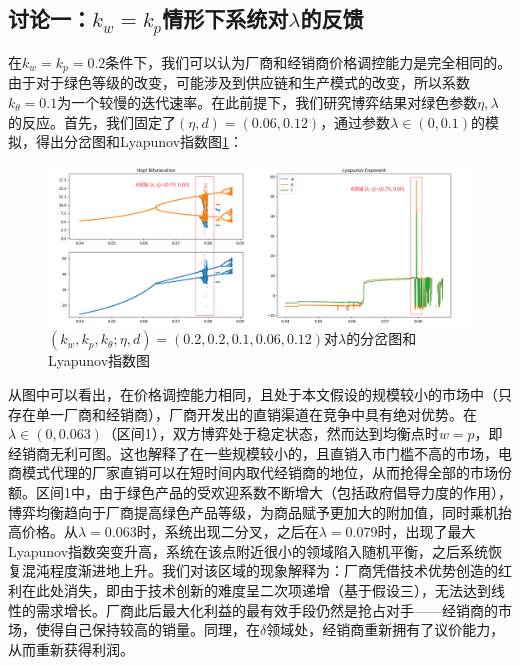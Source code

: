 \documentclass{article}
\begin{document}
\subsection{讨论一：$k_w=k_p$情形下系统对$\lambda$的反馈}
\par 在$k_w=k_p=0.2$条件下，我们可以认为厂商和经销商价格调控能力是完全相同的。由于对于绿色等级的改变，可能涉及到供应链和生产模式的改变，所以系数$k_\theta=0.1$为一个较慢的迭代速率。在此前提下，我们研究博弈结果对绿色参数$\eta, \lambda$的反应。首先，我们固定了$(\eta,d)=(0.06,0.12)$，通过参数$\lambda\in(0,0.1)$的模拟，得出分岔图和Lyapunov指数图\ref{Hopf_Lyapunov_1_1}：
\begin{figure}[H]
    \centering
    \includegraphics[width=16.5cm]{Hopf_Lyapunov_1_1.png}
    \caption{$(k_w,k_p,k_\theta;\eta,d)=(0.2,0.2,0.1,0.06,0.12)$对$\lambda$的分岔图和Lyapunov指数图}
    \label{Hopf_Lyapunov_1_1}
\end{figure}
\par 从图中可以看出，在价格调控能力相同，且处于本文假设的规模较小的市场中（只存在单一厂商和经销商），厂商开发出的直销渠道在竞争中具有绝对优势。在$\lambda\in(0,0.063)$（区间1），双方博弈处于稳定状态，然而达到均衡点时$w=p$，即经销商无利可图。这也解释了在一些规模较小的，且直销入市门槛不高的市场，电商模式代理的厂家直销可以在短时间内取代经销商的地位，从而抢得全部的市场份额。区间1中，由于绿色产品的受欢迎系数不断增大（包括政府倡导力度的作用），博弈均衡趋向于厂商提高绿色产品等级，为商品赋予更加大的附加值，同时乘机抬高价格。从$\lambda=0.063$时，系统出现二分叉，之后在$\lambda=0.079$时，出现了最大Lyapunov指数突变升高，系统在该点附近很小的领域陷入随机平衡，之后系统恢复混沌程度渐进地上升。我们对该区域的现象解释为：厂商凭借技术优势创造的红利在此处消失，即由于技术创新的难度呈二次项递增（基于假设三），无法达到线性的需求增长。厂商此后最大化利益的最有效手段仍然是抢占对手——经销商的市场，使得自己保持较高的销量。同理，在$\delta$领域处，经销商重新拥有了议价能力，从而重新获得利润。
\end{document}
